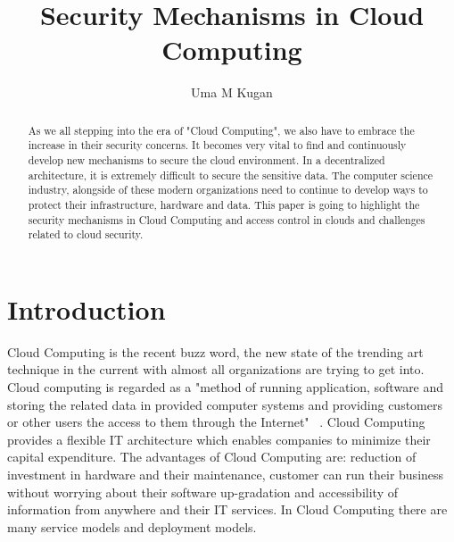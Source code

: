 
\title{Security Mechanisms in Cloud Computing}

\author{Uma M Kugan}
\renewcommand{\shortauthors}{Uma Kugan}

\begin{abstract}
As we all stepping into the era of "Cloud Computing", we also have to embrace
the increase in their security concerns. It becomes very vital to find and 
continuously develop new mechanisms to secure the cloud environment. In a 
decentralized architecture, it is extremely difficult to secure the sensitive
data. The computer science industry, alongside of these modern  organizations
need to continue to develop ways to protect their infrastructure, hardware 
and data. This paper is going to highlight the security mechanisms in Cloud
Computing and access control in clouds and challenges related to cloud security.
\end{abstract}


\maketitle

\section{Introduction}
Cloud Computing is the recent buzz word, the new state of the trending 
art technique in the current with almost all organizations are trying
to get into. Cloud computing is regarded as a "method of running application, 
software and storing the related data in provided computer systems and 
providing customers or other users the access to them through the 
Internet" ~\cite{hid-sp18-513-cloud1}. Cloud Computing provides a flexible IT 
architecture which enables companies to minimize their capital expenditure. 
The advantages of Cloud Computing are: reduction of investment in hardware 
and their maintenance, customer can run their business without worrying 
about their software up-gradation and accessibility of information from 
anywhere and their IT services. In Cloud Computing there are many service 
models and deployment models. 

